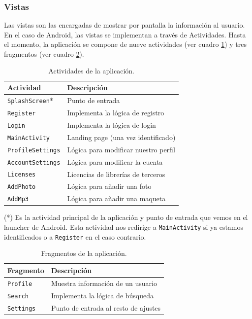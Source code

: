 \documentclass[a4paper,12pt]{article}
\begin{document}
\subsubsection{Vistas}
Las vistas son las encargadas de mostrar por pantalla la información al usuario. En el caso de Android, las vistas se implementan a través de Actividades. Hasta el momento, la aplicación se compone de nueve actividades (ver cuadro \ref{tab:actividades}) y tres fragmentos (ver cuadro \ref{tab:fragmentos}).
\begin{table}[tt]
	\centering
	\label{tab:actividades}
	\caption{Actividades de la aplicación.}
	\begin{tabular}{|l|l|}
		\hline
		Actividad & Descripción \\
		\hline \hline
		\texttt{SplashScreen}* & Punto de entrada\\ \hline
		\texttt{Register} & Implementa la lógica de registro\\ \hline
		\texttt{Login} & Implementa la lógica de login\\ \hline
		\texttt{MainActivity} & Landing page (una vez identificado)\\ \hline
		\texttt{ProfileSettings} & Lógica para modificar nuestro perfil\\ \hline
		\texttt{AccountSettings} & Lógica para modificar la cuenta\\ \hline
		\texttt{Licenses} & Licencias de librerías de terceros\\ \hline
		\texttt{AddPhoto} & Lógica para añadir una foto\\ \hline
		\texttt{AddMp3} & Lógica para añadir una maqueta\\ \hline
	\end{tabular}
	
	\vspace{2mm}
	(*) Es la actividad principal de la aplicación y punto de entrada que vemos en el launcher de Android. Esta actividad nos redirige a \texttt{MainActivity} si ya estamos identificados o a \texttt{Register} en el caso contrario.
\end{table}

\begin{table}[t]
	\centering
	\label{tab:fragmentos}
	\caption{Fragmentos de la aplicación.}
	\begin{tabular}{|l|l|}
		\hline
		Fragmento & Descripción \\
		\hline \hline
		\texttt{Profile} & Muestra información de un usuario\\ \hline
		\texttt{Search} & Implementa la lógica de búsqueda\\ \hline
		\texttt{Settings} & Punto de entrada al resto de ajustes\\ \hline
	\end{tabular}
\end{table}
\end{document}
